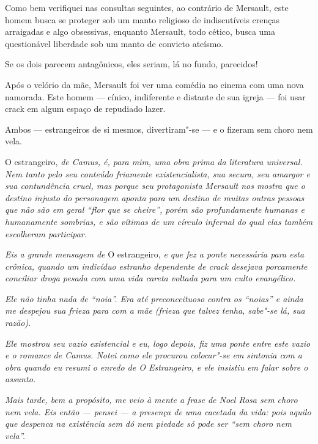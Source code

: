 Como bem verifiquei nas consultas seguintes, ao contrário de Mersault,
este homem busca se proteger sob um manto religioso de indiscutíveis
crenças arraigadas e algo obsessivas, enquanto Mersault, todo cético,
busca uma questionável liberdade sob um manto de convicto ateísmo.

Se os dois parecem antagônicos, eles seriam, lá no fundo, parecidos!

Após o velório da mãe, Mersault foi ver uma comédia no cinema com uma
nova namorada. Este homem --- cínico, indiferente e distante de sua
igreja --- foi usar crack em algum espaço de repudiado lazer.

Ambos --- estrangeiros de si mesmos, divertiram"-se --- e o fizeram sem
choro nem vela.

\begin{center}\asterisc{}\end{center}

O estrangeiro, \emph{de Camus, é, para mim, uma obra prima da literatura
universal. Nem tanto pelo seu conteúdo friamente existencialista, sua
secura, seu amargor e sua contundência cruel, mas porque seu
protagonista Mersault nos mostra que o destino injusto do personagem
aponta para um destino de muitas outras pessoas que não são em geral
``flor que se cheire'', porém são profundamente humanas e humanamente
sombrias, e são vítimas de um círculo infernal do qual elas também
escolheram participar.}

\emph{Eis a grande mensagem de} O estrangeiro, \emph{e que fez a ponte
necessária para esta crônica, quando um indivíduo estranho dependente de
crack desejava porcamente conciliar droga pesada com uma vida careta
voltada para um culto evangélico.}

\emph{Ele não tinha nada de ``noia''. Era até preconceituoso contra os
``noias'' e ainda me despejou sua frieza para com a mãe (frieza que
talvez tenha, sabe"-se lá, sua razão).}

\emph{Ele mostrou seu vazio existencial e eu, logo depois, fiz uma ponte
entre este vazio e o romance de Camus. Notei como ele procurou
colocar"-se em sintonia com a obra quando eu resumi o enredo de \emph{O
Estrangeiro}, e ele insistiu em falar sobre o assunto.}

\emph{Mais tarde, bem a propósito, me veio à mente a frase de Noel Rosa
sem choro nem vela. Eis então --- pensei --- a presença de uma cacetada
da vida: pois aquilo que despenca na existência sem dó nem piedade só
pode ser ``sem choro nem vela''.}

